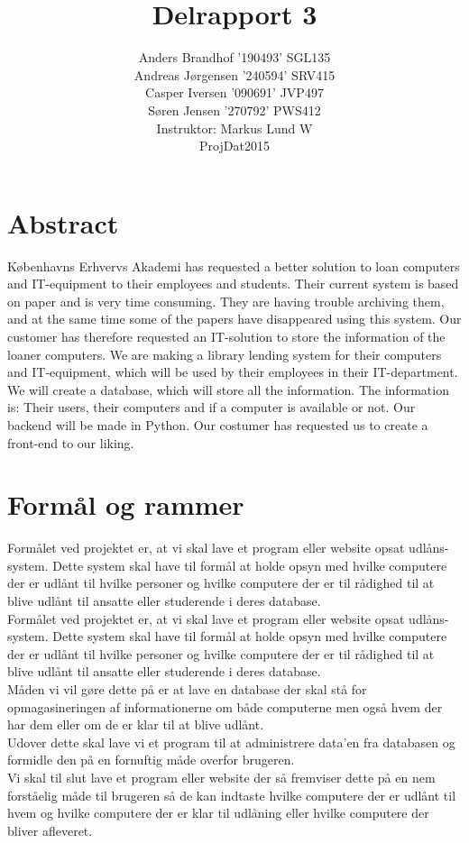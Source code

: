 \documentclass[a4paper]{article}
\title{Delrapport 3}
\author{Anders Brandhof '190493' SGL135 \\ Andreas Jørgensen '240594' SRV415 \\ Casper Iversen '090691' JVP497 \\ Søren Jensen '270792' PWS412 \\
Instruktor: Markus Lund W\\
ProjDat2015}
\begin{document}
\maketitle

\pagebreak

\tableofcontents

\newpage

\section{Abstract}
Københavns Erhvervs Akademi has requested a better solution to loan computers and IT-equipment to their employees and students. Their current system is based on paper and is very time consuming. They are having trouble archiving them, and at the same time some of the papers have disappeared using this system. Our customer has therefore requested an IT-solution to store the information of the loaner computers. We are making a library lending system for their computers and IT-equipment, which will be used by their employees in their IT-department. We will create a database, which will store all the information. The information is: Their users, their computers and if a computer is available or not. Our backend will be made in Python. Our costumer has requested us to create a front-end to our liking. \\
\section{Formål og rammer}
Formålet ved projektet er, at vi skal lave et program eller website opsat udlåns-system. Dette system skal have til formål at holde opsyn med hvilke computere der er udlånt til hvilke personer og hvilke computere der er til rådighed til at blive udlånt til ansatte eller studerende i deres database.\\
Formålet ved projektet er, at vi skal lave et program eller website opsat udlåns-system. Dette system skal have til formål at holde opsyn med hvilke computere der er udlånt til hvilke personer og hvilke computere der er til rådighed til at blive udlånt til ansatte eller studerende i deres database.\\
Måden vi vil gøre dette på er at lave en database der skal stå for opmagasineringen af informationerne om både computerne men også hvem der har dem eller om de er klar til at blive udlånt.\\
Udover dette skal lave vi et program til at administrere data’en fra databasen og formidle den på en fornuftig måde overfor brugeren.\\
Vi skal til slut lave et program eller website der så fremviser dette på en nem forståelig måde til brugeren så de kan indtaste hvilke computere der er udlånt til hvem og hvilke computere der er klar til udlåning eller hvilke computere der bliver afleveret.\\ \\
\end{document}
